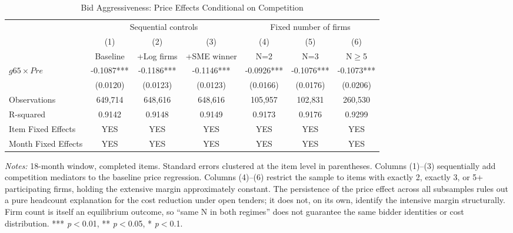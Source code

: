\begin{table}[htbp]
\centering
\caption{Bid Aggressiveness: Price Effects Conditional on Competition}
\label{tab:bid_aggressiveness}
\begin{adjustbox}{max width=\textwidth}
\begin{threeparttable}
\small
\begin{tabular}{lcccccc}
\toprule
 & \multicolumn{3}{c}{Sequential controls} & \multicolumn{3}{c}{Fixed number of firms} \\
\cmidrule(lr){2-4} \cmidrule(lr){5-7}
 & (1) & (2) & (3) & (4) & (5) & (6) \\
 & Baseline & +Log firms & +SME winner & N=2 & N=3 & N$\geq$5 \\
\midrule
$g65 \times Pre$ & -0.1087*** & -0.1186*** & -0.1146*** & -0.0926*** & -0.1076*** & -0.1073*** \\
 & (0.0120) & (0.0123) & (0.0123) & (0.0166) & (0.0176) & (0.0206) \\
\midrule
Observations & 649,714 & 648,616 & 648,616 & 105,957 & 102,831 & 260,530 \\
R-squared & 0.9142 & 0.9148 & 0.9149 & 0.9173 & 0.9176 & 0.9299 \\
Item Fixed Effects & YES & YES & YES & YES & YES & YES \\
Month Fixed Effects & YES & YES & YES & YES & YES & YES \\
\bottomrule
\end{tabular}
\begin{tablenotes}
\small
\item \textit{Notes:} 18-month window, completed items. Standard errors clustered at the item level in parentheses.
Columns (1)--(3) sequentially add competition mediators to the baseline price regression.
Columns (4)--(6) restrict the sample to items with exactly 2, exactly 3, or 5+ participating firms,
holding the extensive margin approximately constant. The persistence of the price effect across all
subsamples rules out a pure headcount explanation for the cost reduction under open tenders; it does
not, on its own, identify the intensive margin structurally. Firm count is itself an equilibrium
outcome, so ``same N in both regimes'' does not guarantee the same bidder identities or cost
distribution.
*** \textit{p}$<$0.01, ** \textit{p}$<$0.05, * \textit{p}$<$0.1.
\end{tablenotes}
\end{threeparttable}
\end{adjustbox}
\end{table}

